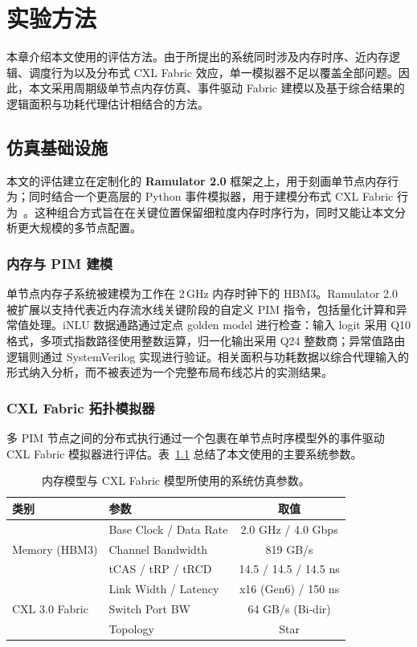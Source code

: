 \chapter{实验方法}
\label{ch:methodology}

本章介绍本文使用的评估方法。由于所提出的系统同时涉及内存时序、近内存逻辑、调度行为以及分布式 CXL Fabric 效应，单一模拟器不足以覆盖全部问题。因此，本文采用周期级单节点内存仿真、事件驱动 Fabric 建模以及基于综合结果的逻辑面积与功耗代理估计相结合的方法。

\section{仿真基础设施}

本文的评估建立在定制化的 \textbf{Ramulator 2.0} 框架之上，用于刻画单节点内存行为；同时结合一个更高层的 Python 事件模拟器，用于建模分布式 CXL Fabric 行为~\cite{ramulator2}。这种组合方式旨在在关键位置保留细粒度内存时序行为，同时又能让本文分析更大规模的多节点配置。

\subsection{内存与 PIM 建模}

单节点内存子系统被建模为工作在 2\,GHz 内存时钟下的 HBM3。Ramulator 2.0 被扩展以支持代表近内存流水线关键阶段的自定义 PIM 指令，包括量化计算和异常值处理。iNLU 数据通路通过定点 golden model 进行检查：输入 logit 采用 Q10 格式，多项式指数路径使用整数运算，归一化输出采用 Q24 整数商；异常值路由逻辑则通过 SystemVerilog 实现进行验证。相关面积与功耗数据以综合代理输入的形式纳入分析，而不被表述为一个完整布局布线芯片的实测结果。

\subsection{CXL Fabric 拓扑模拟器}

多 PIM 节点之间的分布式执行通过一个包裹在单节点时序模型外的事件驱动 CXL Fabric 模拟器进行评估。表~\ref{tab:sim_params} 总结了本文使用的主要系统参数。

\begin{table}[htbp]
\centering
\caption[仿真参数]{内存模型与 CXL Fabric 模型所使用的系统仿真参数。}
\label{tab:sim_params}
\begin{tabular}{llc}
\toprule
\textbf{类别} & \textbf{参数} & \textbf{取值} \\
\midrule
\multirow{3}{*}{Memory (HBM3)} & Base Clock / Data Rate & 2.0 GHz / 4.0 Gbps \\
                              & Channel Bandwidth      & 819 GB/s \\
                              & tCAS / tRP / tRCD     & 14.5 / 14.5 / 14.5 ns \\
\midrule
\multirow{3}{*}{CXL 3.0 Fabric} & Link Width / Latency  & x16 (Gen6) / 150 ns \\
                              & Switch Port BW        & 64 GB/s (Bi-dir) \\
                              & Topology              & Star \\
\bottomrule
\end{tabular}
\end{table}

